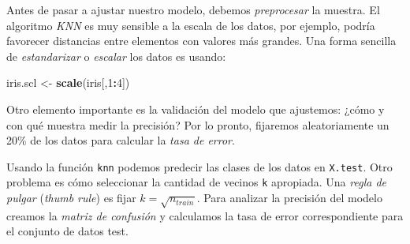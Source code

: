 \documentclass[]{book}
\newenvironment{Shaded}{\begin{snugshade}}{\end{snugshade}}
\newcommand{\CommentTok}[1]{\textcolor[rgb]{0.56,0.35,0.01}{\textit{#1}}}
\newcommand{\DecValTok}[1]{\textcolor[rgb]{0.00,0.00,0.81}{#1}}
\newcommand{\FloatTok}[1]{\textcolor[rgb]{0.00,0.00,0.81}{#1}}
\newcommand{\KeywordTok}[1]{\textcolor[rgb]{0.13,0.29,0.53}{\textbf{#1}}}
\newcommand{\NormalTok}[1]{#1}
\newcommand{\OperatorTok}[1]{\textcolor[rgb]{0.81,0.36,0.00}{\textbf{#1}}}
\newcommand{\StringTok}[1]{\textcolor[rgb]{0.31,0.60,0.02}{#1}}
\begin{document}
Antes de pasar a ajustar nuestro modelo, debemos \emph{preprocesar} la muestra. El algoritmo \emph{KNN} es muy sensible a la escala de los datos, por ejemplo, podría favorecer distancias entre elementos con valores más grandes. Una forma sencilla de \emph{estandarizar} o \emph{escalar} los datos es usando:

\begin{Shaded}
\begin{Highlighting}[]
\NormalTok{iris.scl <-}\StringTok{ }\KeywordTok{scale}\NormalTok{(iris[,}\DecValTok{1}\OperatorTok{:}\DecValTok{4}\NormalTok{])}
\end{Highlighting}
\end{Shaded}

Otro elemento importante es la validación del modelo que ajustemos: ¿cómo y con qué muestra medir la precisión? Por lo pronto, fijaremos aleatoriamente un 20\% de los datos para calcular la \emph{tasa de error}.

\begin{Shaded}
\end{Shaded}

Usando la función \texttt{knn} podemos predecir las clases de los datos en \texttt{X.test}. Otro problema es cómo seleccionar la cantidad de vecinos \texttt{k} apropiada. Una \emph{regla de pulgar} (\emph{thumb rule}) es fijar \(k = \sqrt{n_{train}}\). Para analizar la precisión del modelo creamos la \emph{matriz de confusión} y calculamos la tasa de error correspondiente para el conjunto de datos test.
\end{document}
